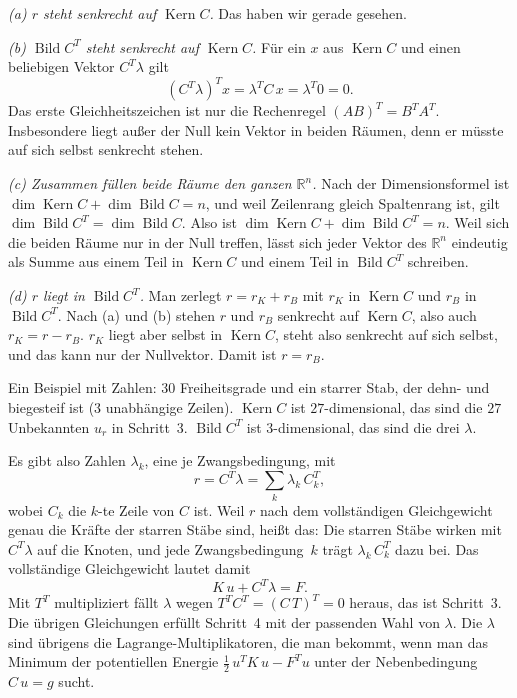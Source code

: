 \emph{(a) $r$ steht senkrecht auf $\operatorname{Kern} C$.} Das haben wir gerade gesehen.

\emph{(b) $\operatorname{Bild} C^T$ steht senkrecht auf $\operatorname{Kern} C$.} Für ein $x$ aus
$\operatorname{Kern} C$ und einen beliebigen Vektor $C^T\lambda$ gilt
\[
  (C^T\lambda)^T x = \lambda^T C\,x = \lambda^T 0 = 0 .
\]
Das erste Gleichheitszeichen ist nur die Rechenregel $(AB)^T = B^T A^T$. Insbesondere liegt außer
der Null kein Vektor in beiden Räumen, denn er müsste auf sich selbst senkrecht stehen.

\emph{(c) Zusammen füllen beide Räume den ganzen $\mathbb R^n$.} Nach der Dimensionsformel ist
$\dim\operatorname{Kern} C + \dim\operatorname{Bild} C = n$, und weil Zeilenrang gleich Spaltenrang
ist, gilt $\dim\operatorname{Bild} C^T = \dim\operatorname{Bild} C$. Also ist
$\dim\operatorname{Kern} C + \dim\operatorname{Bild} C^T = n$. Weil sich die beiden Räume nur in der
Null treffen, lässt sich jeder Vektor des $\mathbb R^n$ eindeutig als Summe aus einem Teil in
$\operatorname{Kern} C$ und einem Teil in $\operatorname{Bild} C^T$ schreiben.

\emph{(d) $r$ liegt in $\operatorname{Bild} C^T$.} Man zerlegt $r = r_K + r_B$ mit $r_K$ in
$\operatorname{Kern} C$ und $r_B$ in $\operatorname{Bild} C^T$. Nach (a) und (b) stehen $r$ und
$r_B$ senkrecht auf $\operatorname{Kern} C$, also auch $r_K = r - r_B$. $r_K$ liegt aber selbst in
$\operatorname{Kern} C$, steht also senkrecht auf sich selbst, und das kann nur der Nullvektor.
Damit ist $r = r_B$.

Ein Beispiel mit Zahlen: $30$ Freiheitsgrade und ein starrer Stab, der dehn- und biegesteif ist
($3$ unabhängige Zeilen). $\operatorname{Kern} C$ ist $27$-dimensional, das sind die $27$
Unbekannten $u_r$ in Schritt~3. $\operatorname{Bild} C^T$ ist $3$-dimensional, das sind die drei
$\lambda$.

Es gibt also Zahlen $\lambda_k$, eine je Zwangsbedingung, mit
\[
  r = C^T \lambda = \sum_k \lambda_k\,C_k^T ,
\]
wobei $C_k$ die $k$-te Zeile von $C$ ist. Weil $r$ nach dem vollständigen Gleichgewicht genau die
Kräfte der starren Stäbe sind, heißt das: Die starren Stäbe wirken mit $C^T\lambda$ auf die Knoten,
und jede Zwangsbedingung~$k$ trägt $\lambda_k\,C_k^T$ dazu bei. Das vollständige Gleichgewicht
lautet damit
\[
  K\,u + C^T\lambda = F .
\]
Mit $T^T$ multipliziert fällt $\lambda$ wegen $T^T C^T = (C\,T)^T = 0$ heraus, das ist Schritt~3.
Die übrigen Gleichungen erfüllt Schritt~4 mit der passenden Wahl von $\lambda$. Die $\lambda$ sind
übrigens die Lagrange-Multiplikatoren, die man bekommt, wenn man das Minimum der potentiellen
Energie $\frac12\,u^T K\,u - F^T u$ unter der Nebenbedingung $C\,u = g$ sucht.

